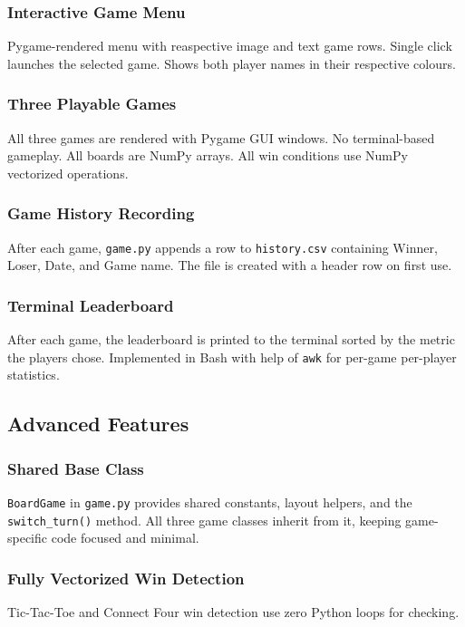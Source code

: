 \documentclass[12pt, letterpaper]{article}
\begin{document}
\subsubsection*{Interactive Game Menu}
Pygame-rendered menu with reaspective image and text game rows. Single click launches the
selected game. Shows both player names in their respective colours.

\subsubsection*{Three Playable Games}
All three games are rendered with Pygame GUI windows. No terminal-based
gameplay. All boards are NumPy arrays. All win conditions use NumPy
vectorized operations.

\subsubsection*{Game History Recording}
After each game, \texttt{game.py} appends a row to \texttt{history.csv}
containing Winner, Loser, Date, and Game name. The file is created with a
header row on first use.

\subsubsection*{Terminal Leaderboard}
After each game, the leaderboard is printed to the terminal sorted by the
metric the players chose. Implemented in Bash with help of \texttt{awk} for per-game
per-player statistics.

\subsection{Advanced Features}

\subsubsection*{Shared Base Class}
\texttt{BoardGame} in \texttt{game.py} provides shared constants,
layout helpers, and the \texttt{switch\_turn()} method. All three game
classes inherit from it, keeping game-specific code focused and minimal.

\subsubsection*{Fully Vectorized Win Detection}
Tic-Tac-Toe and Connect Four win detection use zero Python loops for checking.
\end{document}

